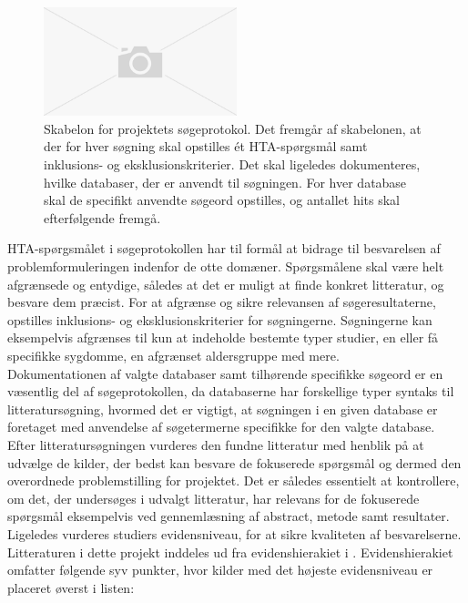 \begin{figure}[H]
\begin{center}
\includegraphics[width=0.5\textwidth]{figures/cMetode/soegeprotokol}
\end{center}
\caption{Skabelon for projektets søgeprotokol. Det fremgår af skabelonen, at der for hver søgning skal opstilles ét HTA-spørgsmål samt inklusions- og eksklusionskriterier. Det skal ligeledes dokumenteres, hvilke databaser, der er anvendt til søgningen. For hver database skal de specifikt anvendte søgeord opstilles, og antallet hits skal efterfølgende fremgå.}
\label{fig:soegeprotokol} 
\end{figure}

HTA-spørgsmålet i søgeprotokollen har til formål at bidrage til besvarelsen af problemformuleringen indenfor de otte domæner. Spørgsmålene skal være helt afgrænsede og entydige, således at det er muligt at finde konkret litteratur, og besvare dem præcist. \citep{metodehaandbogen}  
For at afgrænse og sikre relevansen af søgeresultaterne, opstilles inklusions- og eksklusionskriterier for søgningerne. Søgningerne kan eksempelvis afgrænses til kun at indeholde bestemte typer studier, en eller få specifikke sygdomme, en afgrænset aldersgruppe med mere. \citep{metodehaandbogen} \\
Dokumentationen af valgte databaser samt tilhørende specifikke søgeord er en væsentlig del af søgeprotokollen, da databaserne har forskellige typer syntaks til litteratursøgning, hvormed det er vigtigt, at søgningen i en given database er foretaget med anvendelse af søgetermerne specifikke for den valgte database. \citep{metodehaandbogen}
Efter litteratursøgningen vurderes den fundne litteratur med henblik på at udvælge de kilder, der bedst kan besvare de fokuserede spørgsmål og dermed den overordnede problemstilling for projektet. Det er således essentielt at kontrollere, om det, der undersøges i udvalgt litteratur, har relevans for de fokuserede spørgsmål eksempelvis ved gennemlæsning af abstract, metode samt resultater. Ligeledes vurderes studiers evidensniveau, for at sikre kvaliteten af besvarelserne. \citep{metodehaandbogen} 
Litteraturen i dette projekt inddeles ud fra evidenshierakiet i . Evidenshierakiet omfatter følgende syv punkter, hvor kilder med det højeste evidensniveau er placeret øverst i listen:

